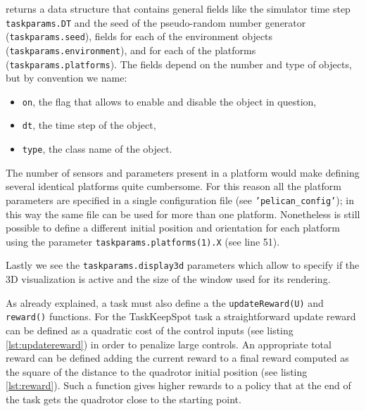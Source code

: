 \documentclass[a4paper,11pt]{report}
\begin{document}
returns a data structure that contains general fields like the simulator time step \texttt{taskparams.DT} and the seed of the pseudo-random number generator (\texttt{taskparams.seed}), fields for each of the environment objects (\texttt{taskparams.environment}), and for each of the platforms (\texttt{taskparams.platforms}). The fields depend on the number and type of objects, but by convention we name:
\begin{itemize}
\item \texttt{on}, the flag that allows to enable and disable the object in question,
\item \texttt{dt}, the time step of the object,
\item \texttt{type}, the class name of the object.
\end{itemize}

The number of sensors and parameters present in a platform would make defining several identical platforms quite cumbersome. For this reason all the platform parameters are specified in a single configuration file (see \texttt{'pelican\_config'}); in this way the same file can be used for more than one platform. Nonetheless is still possible to define a different initial position and orientation for each platform using the parameter \texttt{taskparams.platforms(1).X} (see line 51).

Lastly we see the \texttt{taskparams.display3d} parameters which allow to specify if the 3D visualization is active and the size of the window used for its rendering. 

As already explained, a task must also define a the \texttt{updateReward(U)} and \texttt{reward()} functions. For the TaskKeepSpot task a straightforward update reward can be defined as a quadratic cost of the control inputs (see listing \ref{lst:updatereward}) in order to penalize large controls. An appropriate total reward can be defined adding the current reward to a final reward computed as the square of the distance to the quadrotor initial position (see listing \ref{lst:reward}). Such a function gives higher rewards to a policy that at the end of the task gets the quadrotor close to the starting point.
\end{document}
